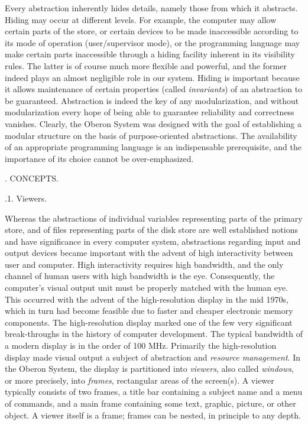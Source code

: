 Every abstraction inherently hides details, namely those from which it
abstracts. Hiding may occur at different levels. For example, the
computer may allow certain parts of the store, or certain devices to
be made inaccessible according to its mode of operation
(user/supervisor mode), or the programming language may make certain
parts inaccessible through a hiding facility inherent in its
visibility rules. The latter is of course much more flexible and
powerful, and the former indeed plays an almost negligible role in our
system. Hiding is important because it allows maintenance of certain
properties (called {\it invariants\/}) of an abstraction to be
guaranteed. Abstraction is indeed the key of any modularization, and
without modularization every hope of being able to guarantee
reliability and correctness vanishes. Clearly, the Oberon System was
designed with the goal of establishing a modular structure on the
basis of purpose-oriented abstractions. The availability of an
appropriate programming language is an indispensable prerequisite, and
the importance of its choice cannot be over-emphasized.

. CONCEPTS.

.1. Viewers.

Whereas the abstractions of individual variables representing parts of
the primary store, and of files representing parts of the disk store
are well established notions and have significance in every computer
system, abstractions regarding input and output devices became
important with the advent of high interactivity between user and
computer. High interactivity requires high bandwidth, and the only
channel of human users with high bandwidth is the eye. Consequently,
the computer's visual output unit must be properly matched with the
human eye. This occurred with the advent of the high-resolution
display in the mid 1970s, which in turn had become feasible due to
faster and cheaper electronic memory components. The high-resolution
display marked one of the few very significant break-throughs in the
history of computer development. The typical bandwidth of a modern
display is in the order of 100 MHz. Primarily the high-resolution
display made visual output a subject of abstraction and {\it resource management\/}.
In the Oberon System, the display is partitioned into
{\it viewers\/}, also called {\it windows\/}, or more precisely, into {\it frames\/},
rectangular areas of the screen(s). A viewer typically consists of two
frames, a title bar containing a subject name and a menu of commands,
and a main frame containing some text, graphic, picture, or other
object. A viewer itself is a frame; frames can be nested, in principle
to any depth.

